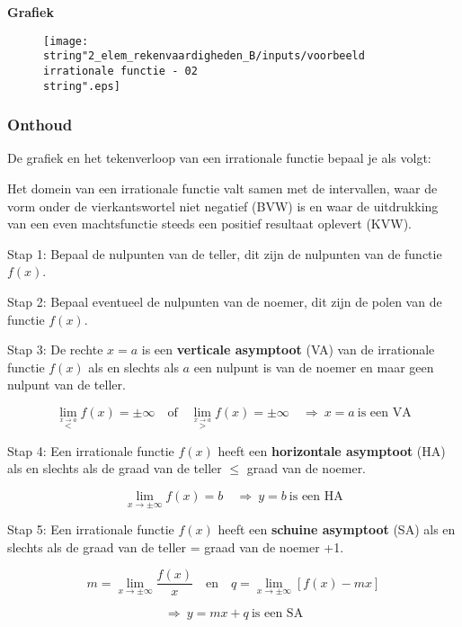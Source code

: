 \textbf{Grafiek}
\begin{figure}[h]
\centering
\texttt{[image: \\string"2\_elem\_rekenvaardigheden\_B/inputs/voorbeeld irrationale functie - 02\\string".eps]}
\end{figure}



\subsubsection{Onthoud}

\begin{framed}

De grafiek en het tekenverloop van een irrationale functie bepaal
je als volgt:\medskip{}

Het domein van een irrationale functie valt samen met de intervallen,
waar de vorm onder de vierkantswortel niet negatief (BVW) is en waar
de uitdrukking van een even machtsfunctie steeds een positief resultaat
oplevert (KVW).

Stap 1: Bepaal de nulpunten van de teller, dit zijn de nulpunten van
de functie $f(x)$.

Stap 2: Bepaal eventueel de nulpunten van de noemer, dit zijn de polen
van de functie $f(x)$.

Stap 3: De rechte $x=a$ is een \textbf{verticale asymptoot} (VA)
van de irrationale functie $f(x)$ als en slechts als $a$ een nulpunt
is van de noemer en maar geen nulpunt van de teller.

\[
{\displaystyle {\displaystyle \lim_{\overset{x\rightarrow a}{<}}}f(x)=\pm\infty\quad\textrm{of}\quad{\displaystyle \lim_{\overset{x\rightarrow a}{>}}}f(x)=\pm\infty\quad\Rightarrow\:x=a\:\textrm{is een VA}}
\]


Stap 4: Een irrationale functie $f(x)$ heeft een \textbf{horizontale
asymptoot} (HA) als en slechts als de graad van de teller \ensuremath{\le}
graad van de noemer.

\[
{\displaystyle {\displaystyle \lim_{x\to\pm\infty}}f(x)=b\quad\Rightarrow\:y=b\:\textrm{is een HA}}
\]


Stap 5: Een irrationale functie $f(x)$ heeft een \textbf{schuine
asymptoot} (SA) als en slechts als de graad van de teller = graad
van de noemer +1.

\[
{\displaystyle m={\displaystyle \lim_{x\to\pm\infty}}\frac{f(x)}{x}\quad\textrm{en}\quad q={\displaystyle \lim_{x\to\pm\infty}}\left[f(x)-mx\right]}
\]


\[
{\displaystyle \Rightarrow\:y=mx+q\:\textrm{is een SA}}
\]



\end{framed}
